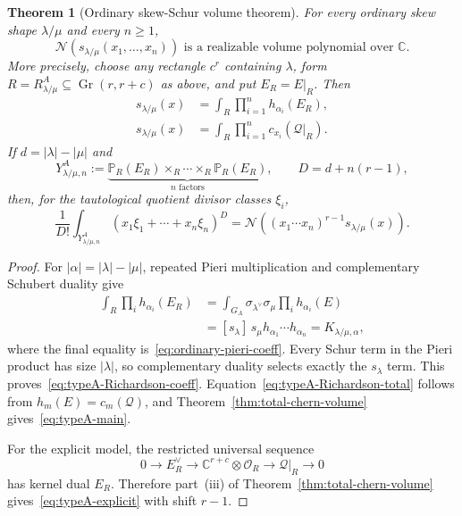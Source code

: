 \documentclass[11pt,a4paper,oneside]{amsart}
\numberwithin{equation}{section}
\newtheorem{theorem}{Theorem}[section]
\theoremstyle{definition}
\theoremstyle{remark}
\DeclareMathOperator{\Gr}{Gr}
\newcommand{\C}{\mathbb C}
\newcommand{\cN}{\mathcal N}
\newcommand{\cO}{\mathcal O}
\newcommand{\cQ}{\mathcal Q}
\begin{document}
\begin{theorem}[Ordinary skew-Schur volume theorem]\label{thm:main-A}
For every ordinary skew shape $\lambda/\mu$ and every $n\geq1$,
\begin{equation}\label{eq:typeA-main}
 \cN(s_{\lambda/\mu}(x_1,\ldots,x_n))
 \text{ is a realizable volume polynomial over }\C.
\end{equation}
More precisely, choose any rectangle $c^r$ containing $\lambda$, form
$R=R^A_{\lambda/\mu}\subseteq\Gr(r,r+c)$ as above, and put
$E_R=E|_R$.  Then
\begin{align}
 [x^\alpha]s_{\lambda/\mu}(x)
 &=\int_R\prod_{i=1}^nh_{\alpha_i}(E_R),
 \label{eq:typeA-Richardson-coeff}\\
 s_{\lambda/\mu}(x)
 &=\int_R\prod_{i=1}^nc_{x_i}(\cQ|_R).
 \label{eq:typeA-Richardson-total}
\end{align}
If $d=|\lambda|-|\mu|$ and
\[
 Y^A_{\lambda/\mu,n}
 :=\underbrace{\mathbb P_R(E_R)\times_R\cdots\times_R\mathbb P_R(E_R)}_{n\text{ factors}},
 \qquad D=d+n(r-1),
\]
then, for the tautological quotient divisor classes $\xi_i$,
\begin{equation}\label{eq:typeA-explicit}
 \frac1{D!}\int_{Y^A_{\lambda/\mu,n}}
 (x_1\xi_1+\cdots+x_n\xi_n)^D
 =\cN\!\left((x_1\cdots x_n)^{r-1}s_{\lambda/\mu}(x)\right).
\end{equation}
\end{theorem}

\begin{proof}
For $|\alpha|=|\lambda|-|\mu|$, repeated Pieri multiplication and complementary Schubert duality give
\begin{align*}
 \int_R\prod_i h_{\alpha_i}(E_R)
 &=\int_{G_A}\sigma_{\lambda^\vee}\sigma_\mu
   \prod_i h_{\alpha_i}(E)\\
 &=[s_\lambda]\,s_\mu h_{\alpha_1}\cdots h_{\alpha_n}
 =K_{\lambda/\mu,\alpha},
\end{align*}
where the final equality is~\eqref{eq:ordinary-pieri-coeff}.  Every Schur term in the Pieri product has size $|\lambda|$, so complementary duality selects exactly the $s_\lambda$ term.  This proves~\eqref{eq:typeA-Richardson-coeff}.  Equation~\eqref{eq:typeA-Richardson-total} follows from $h_m(E)=c_m(\cQ)$, and Theorem~\ref{thm:total-chern-volume} gives~\eqref{eq:typeA-main}.

For the explicit model, the restricted universal sequence
\[
 0\longrightarrow E_R^\vee\longrightarrow\C^{r+c}\otimes\cO_R
 \longrightarrow\cQ|_R\longrightarrow0
\]
has kernel dual $E_R$.  Therefore part~(iii) of Theorem~\ref{thm:total-chern-volume} gives~\eqref{eq:typeA-explicit} with shift $r-1$.
\end{proof}
\end{document}
